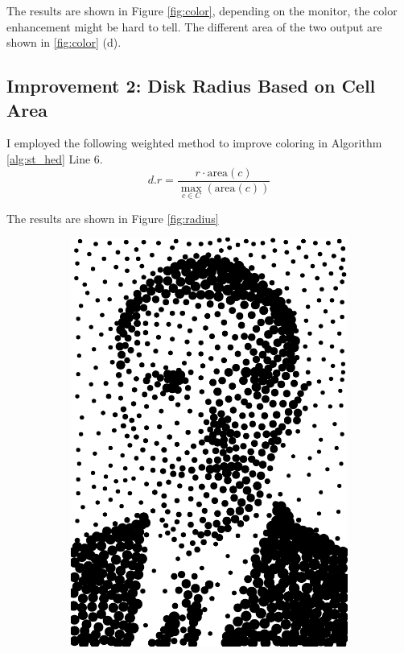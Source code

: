 \documentclass[11pt]{article}
\begin{document}
The results are shown in Figure \ref{fig:color}, depending on the monitor, the color enhancement might be hard to tell. The different area of the two output are shown in \ref{fig:color} (d).

\subsection*{Improvement 2: Disk Radius Based on Cell Area}
I employed  the following weighted method to improve coloring in Algorithm \ref{alg:st_hed} Line 6.
$$d.r =\frac{ r\cdot \text{area}(c) } { \max_{c \in C}{(\text{area}(c) )}}$$

The results are shown in Figure \ref{fig:radius}

\begin{figure}[H]
    \centering
        \begin{subfigure}{0.4\textwidth}
        \centering
        \includegraphics[width=\textwidth]{../results/hedcuter/B-1.pdf}

\end{subfigure}
\end{figure}
\end{document}
